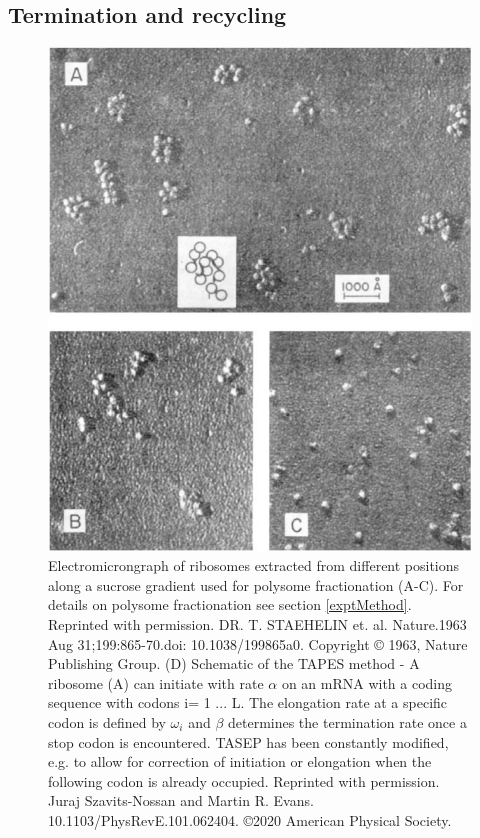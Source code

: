 \documentclass[12pt,openany]{book}
\begin{document}
\clearpage

\subsection{Termination and recycling}\begin{figure}
  \includegraphics{./figures/polysome.pdf}
  \caption{Electromicrongraph of ribosomes extracted from different positions along a sucrose gradient used for polysome fractionation (A-C). For details on polysome fractionation see section \ref{exptMethod}. Reprinted with permission. DR. T. STAEHELIN et. al. Nature.1963 Aug 31;199:865-70.doi: 10.1038/199865a0. Copyright © 1963, Nature Publishing Group.
(D)  Schematic of the TAPES method - A ribosome (A) can initiate with rate \(\alpha\) on an mRNA with a coding sequence with codons i= 1 ... L. The elongation rate at a specific codon is defined by \(\omega_i\) and \(\beta\) determines the termination rate once a stop codon is encountered. TASEP has been constantly modified, e.g. to allow for correction of initiation or elongation when the following codon is already occupied. Reprinted with permission. Juraj Szavits-Nossan and Martin R. Evans. 10.1103/PhysRevE.101.062404. ©2020 American Physical Society. 
 \label{fig:polysomes}}
\end{figure}
\end{document}
